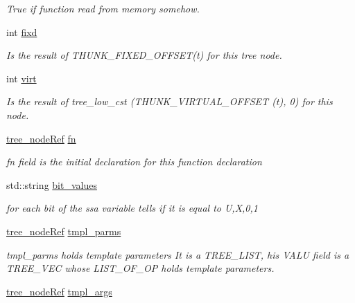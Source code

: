 \begin{DoxyCompactItemize}
\begin{DoxyCompactList}\small\item\em True if function read from memory somehow. \end{DoxyCompactList}\item 
int \hyperlink{structfunction__decl_a60b3a2ebe112f82e850ef7cd999fa29d}{fixd}
\begin{DoxyCompactList}\small\item\em Is the result of T\+H\+U\+N\+K\+\_\+\+F\+I\+X\+E\+D\+\_\+\+O\+F\+F\+S\+E\+T(t) for this tree node. \end{DoxyCompactList}\item 
int \hyperlink{structfunction__decl_a4049457c006c5c4652f98868a5939738}{virt}
\begin{DoxyCompactList}\small\item\em Is the result of tree\+\_\+low\+\_\+cst (T\+H\+U\+N\+K\+\_\+\+V\+I\+R\+T\+U\+A\+L\+\_\+\+O\+F\+F\+S\+ET (t), 0) for this node. \end{DoxyCompactList}\item 
\hyperlink{tree__node_8hpp_a6ee377554d1c4871ad66a337eaa67fd5}{tree\+\_\+node\+Ref} \hyperlink{structfunction__decl_a7a1f7ff08c9daaa51177fdf58f95bacf}{fn}
\begin{DoxyCompactList}\small\item\em fn field is the initial declaration for this function declaration \end{DoxyCompactList}\item 
std\+::string \hyperlink{structfunction__decl_a2c9b0b82e432d51912cf4f01d0adb320}{bit\+\_\+values}
\begin{DoxyCompactList}\small\item\em for each bit of the ssa variable tells if it is equal to U,X,0,1 \end{DoxyCompactList}\item 
\hyperlink{tree__node_8hpp_a6ee377554d1c4871ad66a337eaa67fd5}{tree\+\_\+node\+Ref} \hyperlink{structfunction__decl_a467966c33443732c7b158139ac7d0ec6}{tmpl\+\_\+parms}
\begin{DoxyCompactList}\small\item\em tmpl\+\_\+parms holds template parameters It is a T\+R\+E\+E\+\_\+\+L\+I\+ST, his V\+A\+LU field is a T\+R\+E\+E\+\_\+\+V\+EC whose L\+I\+S\+T\+\_\+\+O\+F\+\_\+\+OP holds template parameters. \end{DoxyCompactList}\item 
\hyperlink{tree__node_8hpp_a6ee377554d1c4871ad66a337eaa67fd5}{tree\+\_\+node\+Ref} \hyperlink{structfunction__decl_ace7c0a40b741941cfe82deeeee8e1a2c}{tmpl\+\_\+args}

\end{DoxyCompactItemize}
